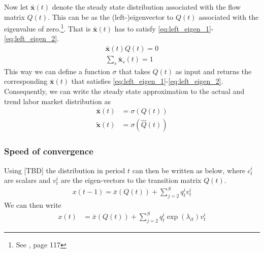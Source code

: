 Now let $\mathbf{\bar{x}}(t)$ denote the steady state distribution associated with the flow matrix $Q(t)$. This can be as the (left-)eigenvector to $Q(t)$ associated with the eigenvalue of zero.\footnote{See \cite{Norris1997}, page 117}. That is $\mathbf{\bar{x}}(t)$ has to satisfy \eqref{eq:left_eigen_1}-\eqref{eq:left_eigen_2}.
\begin{align}
\mathbf {\bar{x}}(t) Q(t)=0 \label{eq:left_eigen_1} \\
\sum_s{\mathbf {\bar x}}_s(t) = 1 \label{eq:left_eigen_2}
\end{align} 
This way we can define a function $\sigma$ that takes $Q(t)$ as input and returns the corresponding $\mathbf{\bar{x}}(t)$ that satisfies \eqref{eq:left_eigen_1}-\eqref{eq:left_eigen_2}. Consequently, we can write the steady state approximation to the actual and trend labor market distribution as 
\begin{align}
\mathbf {\bar{x}}(t) &= \sigma \left( Q(t) \right) \label{eq:stst_x} \\
\mathbf {\tilde{x}}(t) &= \sigma \left( \hat{Q}(t) \right) \label{eq:stst_x_trend} 
\end{align}

\subsubsection{Speed of convergence}
\label{sec:method_st_st_conv_speed}

Using [TBD] the distribution in period $t$ can then be written as below, where $c_t^i$ are scalars and $v_t^i$ are the eigen-vectors to the transition matrix $Q(t)$.
\begin{align}
x(t-1)=\bar{x} \left(  Q(t) \right)+\sum_{j=2}^S q_t^i v_t^i \label{eq:eigen_dyn}
\end{align}
We can then write 
\begin{align}
x(t)&=\bar{x} \left(  Q(t) \right)+\sum_{j=2}^S q_t^i \exp(\lambda_{it}) v_t^i \label{eq:dynamics}
\end{align}

